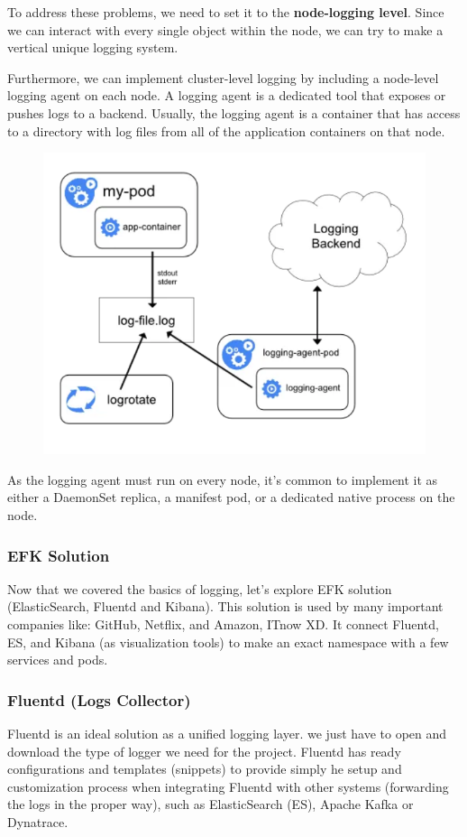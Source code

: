 \documentclass{article}
\begin{document}
To address these problems, we need to set it to the \textbf{node-logging level}. Since we can interact with every single object within the node, we can try to make a vertical unique logging system. 

Furthermore, we can implement cluster-level logging by including a node-level logging agent on each node. A logging agent is a dedicated tool that exposes or pushes logs to a backend. Usually, the logging agent is a container that has access to a directory with log files from all of the application containers on that node.

\begin{figure}[H]
    \includegraphics[width=\textwidth]{pictures/loggingsol.png}
\end{figure}

As the logging agent must run on every node, it's common to implement it as either a DaemonSet replica, a manifest pod, or a dedicated native process on the node.

\subsubsection{EFK Solution}

Now that we covered the basics of logging, let's explore EFK solution (ElasticSearch, Fluentd and Kibana). This solution is used by many important companies like: GitHub, Netflix, and Amazon, ITnow XD. It connect Fluentd, ES, and Kibana (as visualization tools) to make an exact namespace with a few services and pods.

\subsubsection{Fluentd (Logs Collector)}
Fluentd is an ideal solution as a unified logging layer. we just have to open and download the type of logger we need for the project.
Fluentd has ready configurations and templates (snippets) to provide simply he setup and customization process when integrating Fluentd with other systems (forwarding the logs in the proper way), such as ElasticSearch (ES), Apache Kafka or Dynatrace.
\end{document}
